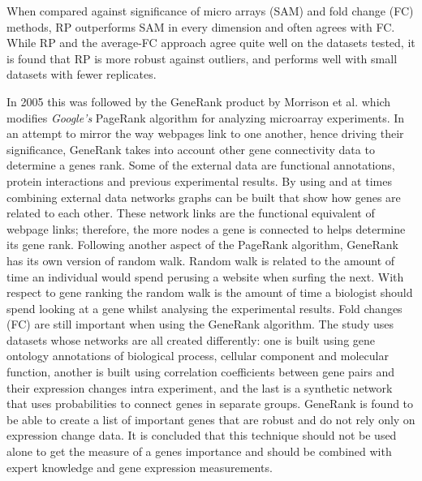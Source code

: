When compared against significance of micro arrays (SAM) and fold change (FC) methods, RP outperforms SAM in every dimension and often agrees with FC.
While RP and the average-FC approach agree quite well on the datasets tested, it is found that RP is more robust against outliers, and performs well with small datasets with fewer replicates.

In 2005 this was followed by the GeneRank product by Morrison et al.\cite{morrison2005} which modifies \textit{Google's} PageRank \cite{langville2004deeper} algorithm for analyzing microarray experiments.
In an attempt to mirror the way webpages link to one another, hence driving their significance, GeneRank takes into account other gene connectivity data to determine a genes rank.
Some of the external data are functional annotations, protein interactions and previous experimental results.
By using and at times combining external data networks graphs can be built that show how genes are related to each other.
These network links are the functional equivalent of webpage links; therefore, the more nodes a gene is connected to helps determine its gene rank.
Following another aspect of the PageRank algorithm, GeneRank has its own version of random walk.
Random walk is related to the amount of time an individual would spend perusing a website when surfing the next.
With respect to gene ranking the random walk is the amount of time a biologist should spend looking at a gene whilst analysing the experimental results.
Fold changes (FC) are still important when using the GeneRank algorithm.
The study uses datasets whose networks are all created differently: one is built using gene ontology annotations of biological process, cellular component and molecular function, another is built using correlation coefficients between gene pairs and their expression changes intra experiment, and the last is a synthetic network that uses probabilities to connect genes in separate groups.
GeneRank is found to be able to create a list of important genes that are robust and do not rely only on expression change data.
It is concluded that this technique should not be used alone to get the measure of a genes importance and should be combined with expert knowledge and gene expression measurements.

